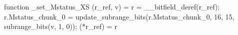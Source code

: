 function _set_Mstatus_XS (r_ref, v) = {
    r = __bitfield_deref(r_ref);
    r.Mstatus_chunk_0 = update_subrange_bits(r.Mstatus_chunk_0, 16, 15, subrange_bits(v, 1, 0));
    (*r_ref) = r
}
